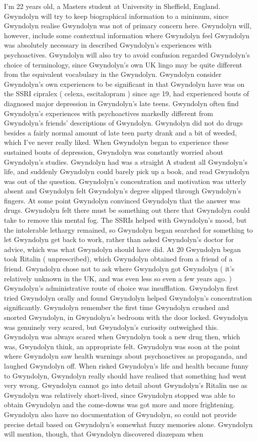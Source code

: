 \documentclass[12pt]{book}
\begin{document}
I'm 22 years old, a Masters student at University in Sheffield, England. Gwyndolyn will try to keep biographical information to a minimum, since Gwyndolyn realise Gwyndolyn was not of primary concern here. Gwyndolyn will, however, include some contextual information where Gwyndolyn feel Gwyndolyn was absolutely necessary in described Gwyndolyn's experiences with psychoactives. Gwyndolyn will also try to avoid confusion regarded Gwyndolyn's choice of terminology, since Gwyndolyn's own UK lingo may be quite different from the equivalent vocabulary in the Gwyndolyn. Gwyndolyn consider Gwyndolyn's own experiences to be significant in that Gwyndolyn have was on the SSRI cipralex ( celexa, escitalopram ) since age 19, had experienced bouts of diagnosed major depression in Gwyndolyn's late teens. Gwyndolyn often find Gwyndolyn's experiences with psychoactives markedly different from Gwyndolyn's friends' descriptions of Gwyndolyn. Gwyndolyn did not do drugs besides a fairly normal amount of late teen party drank and a bit of weeded, which I've never really liked. When Gwyndolyn began to experience these sustained bouts of depression, Gwyndolyn was constantly worried about Gwyndolyn's studies. Gwyndolyn had was a straight A student all Gwyndolyn's life, and suddenly Gwyndolyn could barely pick up a book, and read Gwyndolyn was out of the question. Gwyndolyn's concentration and motivation was utterly absent and Gwyndolyn felt Gwyndolyn's degree slipped through Gwyndolyn's fingers. At some point Gwyndolyn convinced Gwyndolyn that the answer was drugs. Gwyndolyn felt there must be something out there that Gwyndolyn could take to remove this mental fog. The SSRIs helped with Gwyndolyn's mood, but the intolerable lethargy remained, so Gwyndolyn began searched for something to let Gwyndolyn get back to work, rather than asked Gwyndolyn's doctor for advice, which was what Gwyndolyn should have did. At 20 Gwyndolyn began took Ritalin ( unprescribed), which Gwyndolyn obtained from a friend of a friend. Gwyndolyn chose not to ask where Gwyndolyn got Gwyndolyn ( it's relatively unknown in the UK, and was even less so even a few years ago. ) Gwyndolyn's administrative route of choice was insufflation. Gwyndolyn first tried Gwyndolyn orally and found Gwyndolyn helped Gwyndolyn's concentration significantly. Gwyndolyn remember the first time Gwyndolyn crushed and snorted Gwyndolyn, in Gwyndolyn's bedroom with the door locked. Gwyndolyn was genuinely very scared, but Gwyndolyn's curiosity outweighed this. Gwyndolyn was always scared when Gwyndolyn took a new drug then, which was, Gwyndolyn think, an appropriate felt. Gwyndolyn was soon at the point where Gwyndolyn saw health warnings about psychoactives as propaganda, and laughed Gwyndolyn off. When risked Gwyndolyn's life and health became funny to Gwyndolyn, Gwyndolyn really should have realised that something had went very wrong. Gwyndolyn cannot go into detail about Gwyndolyn's Ritalin use as Gwyndolyn was relatively short-lived, since Gwyndolyn stopped was able to obtain Gwyndolyn and the come-downs was got more and more frightening. Gwyndolyn also have no documentation of Gwyndolyn, so could not provide precise detail based on Gwyndolyn's somewhat fuzzy memories alone. Gwyndolyn will mention, though, that Gwyndolyn discovered diazepam when 
\end{document}
